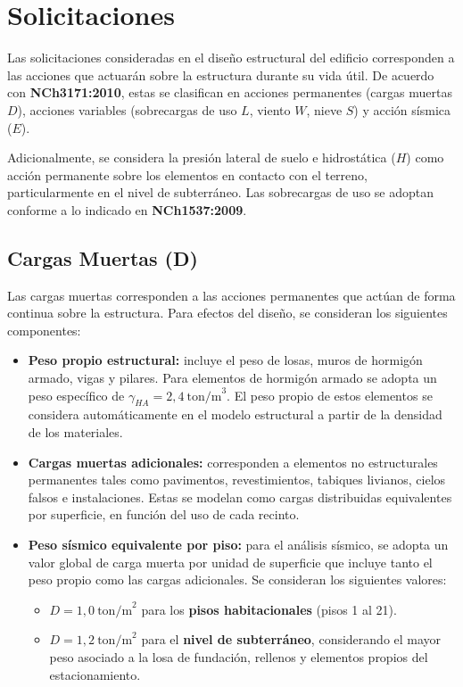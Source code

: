 \section{Solicitaciones}

Las solicitaciones consideradas en el diseño estructural del edificio corresponden a las acciones que actuarán sobre la estructura durante su vida útil. De acuerdo con \textbf{NCh3171:2010}, estas se clasifican en acciones permanentes (cargas muertas $D$), acciones variables (sobrecargas de uso $L$, viento $W$, nieve $S$) y acción sísmica ($E$). 

Adicionalmente, se considera la presión lateral de suelo e hidrostática ($H$) como acción permanente sobre los elementos en contacto con el terreno, particularmente en el nivel de subterráneo. Las sobrecargas de uso se adoptan conforme a lo indicado en \textbf{NCh1537:2009}.

\subsection{Cargas Muertas (D)}

Las cargas muertas corresponden a las acciones permanentes que actúan de forma continua sobre la estructura. Para efectos del diseño, se consideran los siguientes componentes:

\begin{itemize}
    \item \textbf{Peso propio estructural:} incluye el peso de losas, muros de hormigón armado, vigas y pilares. Para elementos de hormigón armado se adopta un peso específico de $\gamma_{HA} = 2{,}4\ \text{ton/m}^3$. El peso propio de estos elementos se considera automáticamente en el modelo estructural a partir de la densidad de los materiales.

    \item \textbf{Cargas muertas adicionales:} corresponden a elementos no estructurales permanentes tales como pavimentos, revestimientos, tabiques livianos, cielos falsos e instalaciones. Estas se modelan como cargas distribuidas equivalentes por superficie, en función del uso de cada recinto.

    \item \textbf{Peso sísmico equivalente por piso:} para el análisis sísmico, se adopta un valor global de carga muerta por unidad de superficie que incluye tanto el peso propio como las cargas adicionales. Se consideran los siguientes valores:
    \begin{itemize}
        \item $D = 1{,}0\ \text{ton/m}^2$ para los \textbf{pisos habitacionales} (pisos 1 al 21).
        \item $D = 1{,}2\ \text{ton/m}^2$ para el \textbf{nivel de subterráneo}, considerando el mayor peso asociado a la losa de fundación, rellenos y elementos propios del estacionamiento.
    \end{itemize}
\end{itemize}

